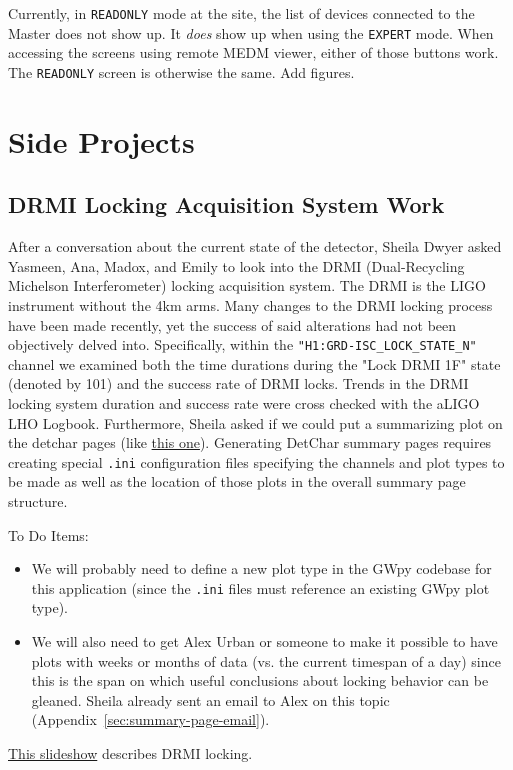 \documentclass{article}
\newcommand*{\TODO}{\textcolor{todo}}
\begin{document}
Currently, in \texttt{READONLY} mode at the site, the list of devices connected to the Master does not show up. It \textit{does} show up when using the \texttt{EXPERT} mode. When accessing the screens using remote MEDM viewer, either of those buttons work. The \texttt{READONLY} screen is otherwise the same. 
\TODO{Add figures.}

\section{Side Projects}

\TODO{\subsection{DRMI Locking Acquisition System Work}}

After a conversation about the current state of the detector, Sheila Dwyer asked Yasmeen, Ana, Madox, and Emily to look into the DRMI (Dual-Recycling Michelson Interferometer) locking acquisition system. The DRMI is the LIGO instrument without the 4km arms. Many changes to the DRMI locking process have been made recently, yet the success of said alterations had not been objectively delved into. Specifically, within the \texttt{"H1:GRD-ISC\_LOCK\_STATE\_N"} channel we examined both the time durations during the "Lock DRMI 1F" state (denoted by 101) and the success rate of DRMI locks. Trends in the DRMI locking system duration and success rate were cross checked with the aLIGO LHO Logbook. Furthermore, Sheila asked if we could put a summarizing plot on the detchar pages (like \href{https://ldas-jobs.ligo.caltech.edu/~detchar/summary/day/20190111/psl/}{this one}). Generating DetChar summary pages requires creating special \texttt{.ini} configuration files specifying the channels and plot types to be made as well as the location of those plots in the overall summary page structure.

To Do Items:

\begin{itemize}
    \item \TODO{We will probably need to define a new plot type in the GWpy codebase for this application (since the \texttt{.ini} files must reference an existing GWpy plot type).}
    \item \TODO{We will also need to get Alex Urban or someone to make it possible to have plots with weeks or months of data (vs. the current timespan of a day) since this is the span on which useful conclusions about locking behavior can be gleaned. Sheila already sent an email to Alex on this topic (Appendix~\ref{sec:summary-page-email}).}
\end{itemize}
\href{https://dcc.ligo.org/LIGO-G1301236}{This slideshow} describes DRMI locking.
\end{document}
